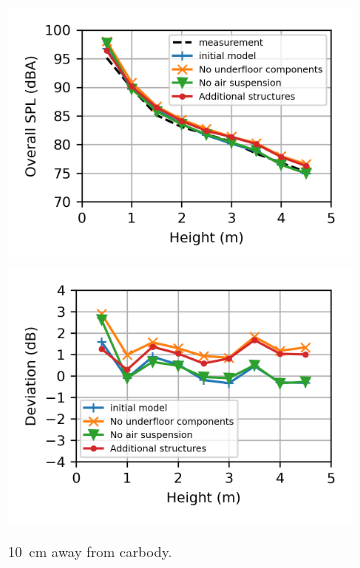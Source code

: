 \begin{figure}
	\centering
	\begin{subfigure}[b]{\textwidth}
		\centering
		\includegraphics{fig/chap5/geometry_variation/overall_SPL/pos_a.png}
		\hfill
		\includegraphics{fig/chap5/geometry_variation/overall_SPL/pos_a_deviation.png}
		\caption{\SI{10}{\centi\meter} away from carbody.}
	\end{subfigure}
	\\
	\begin{subfigure}[b]{\textwidth}
		\centering

\end{subfigure}
\end{figure}
